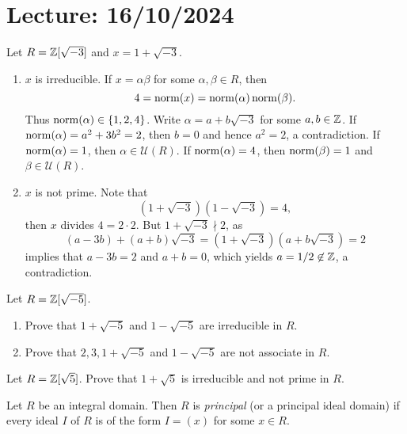 \section{Lecture: 16/10/2024}

\begin{example}
	Let $R=\mathbb{Z}[\sqrt{-3}]$ and $x=1+\sqrt{-3}$. 
	\begin{enumerate}
		\item $x$ is irreducible. 
	If $x=\alpha\beta$ for some $\alpha,\beta\in R$, then 
	\[
 4=\operatorname{norm}(x)=\operatorname{norm}(\alpha)\operatorname{norm}(\beta).
 \]
 Thus $\operatorname{norm}(\alpha)\in\{1,2,4\}$. 
	Write $\alpha=a+b\sqrt{-3}$ for some $a,b\in\mathbb{Z}$. 
	If $\operatorname{norm}(\alpha)=a^2+3b^2=2$, then $b=0$ and hence
	$a^2=2$, a contradiction. If $\operatorname{norm}(\alpha)=1$, then $\alpha\in\mathcal{U}(R)$.
	If $\operatorname{norm}(\alpha)=4$, then $\operatorname{norm}(\beta)=1$ and $\beta\in\mathcal{U}(R)$. 
%
%	
%	
		\item $x$ is not prime. Note that 
  \[
  (1+\sqrt{-3})(1-\sqrt{-3})=4,
  \]
  then 
		$x$ divides $4=2\cdot 2$. But $1+\sqrt{-3}\nmid 2$, as 
		\[
		(a-3b)+(a+b)\sqrt{-3}=(1+\sqrt{-3})(a+b\sqrt{-3})=2
		\]
		implies that $a-3b=2$ and $a+b=0$, which yields 
		$a=1/2\not\in\mathbb{Z}$, a contradiction.
	\end{enumerate}
\end{example}

\begin{exercise}
	Let $R=\mathbb{Z}[\sqrt{-5}]$. 
	\begin{enumerate}
		\item Prove that $1+\sqrt{-5}$ and $1-\sqrt{-5}$ are irreducible in $R$. 
		\item Prove that $2,3,1+\sqrt{-5}$ and $1-\sqrt{-5}$ are not associate in $R$.
	\end{enumerate}
\end{exercise}

\begin{exercise}
	Let $R=\mathbb{Z}[\sqrt{5}]$. 
	Prove that $1+\sqrt{5}$ is irreducible and not prime in $R$. 	
\end{exercise}

\begin{definition}
	Let $R$ be an integral domain. Then $R$ is \emph{principal} 
	(or a principal ideal domain) if
	every ideal $I$ of $R$ is of the form $I=(x)$ for some $x\in R$.   
\end{definition}


